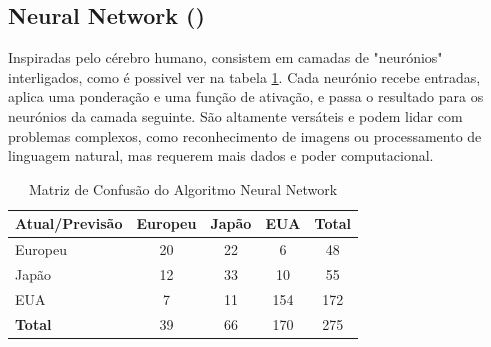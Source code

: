 \documentclass[conference]{IEEEtran}
\begin{document}
\subsection{Neural Network (\cite{neural})}
Inspiradas pelo cérebro humano, consistem em camadas de "neurónios" interligados, como é possivel ver na tabela \ref{tab:conf_matrix_neural}.
Cada neurónio recebe entradas, aplica uma ponderação e uma função de ativação, e passa o resultado para os neurónios da camada seguinte.
São altamente versáteis e podem lidar com problemas complexos, como reconhecimento de imagens ou processamento de linguagem natural,
mas requerem mais dados e poder computacional.
\begin{table}[!ht]
	\centering
	\begin{tabular}{lcccc}
		\toprule
		\textbf{Atual/Previsão} & \textbf{Europeu} & \textbf{Japão} & \textbf{EUA} & \textbf{Total} \\
		\midrule
		Europeu                 & 20               & 22             & 6           & 48             \\
		Japão                   & 12                & 33             & 10           & 55             \\
		EUA                     & 7               & 11             & 154          & 172            \\
		\midrule
		\textbf{Total}          & 39               & 66             & 170          &   275          \\
		\bottomrule
	\end{tabular}
	\caption{Matriz de Confusão do Algoritmo Neural Network}
	\label{tab:conf_matrix_neural}

\end{table}

\end{document}
